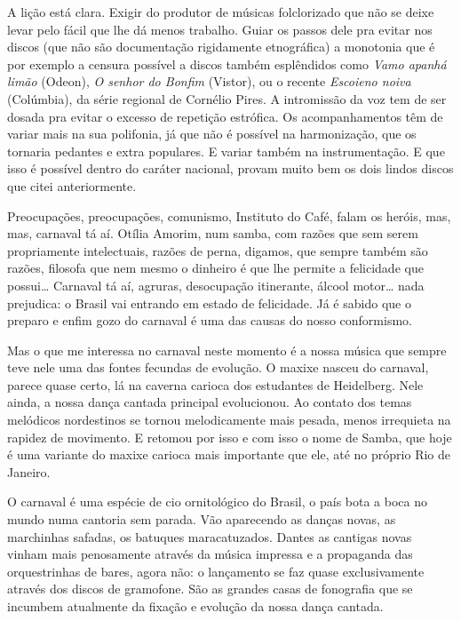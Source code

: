 A lição está clara. Exigir do produtor de músicas folclorizado que não
se deixe levar pelo fácil que lhe dá menos trabalho. Guiar os passos
dele pra evitar nos discos (que não são documentação rigidamente
etnográfica) a monotonia que é por exemplo a censura possível a discos
também esplêndidos como \emph{Vamo apanhá limão} (Odeon), \emph{O senhor
do Bonfim} (Vistor), ou o recente \emph{Escoieno noiva} (Colúmbia), da
série regional de Cornélio Pires. A intromissão da voz tem de ser dosada
pra evitar o excesso de repetição estrófica. Os acompanhamentos têm de
variar mais na sua polifonia, já que não é possível na harmonização, que
os tornaria pedantes e extra populares. E variar também na
instrumentação. E que isso é possível dentro do caráter nacional, provam
muito bem os dois lindos discos que citei anteriormente.



Preocupações, preocupações, comunismo, Instituto do Café, falam os
heróis, mas, mas, carnaval tá aí. Otília Amorim, num samba, com razões
que sem serem propriamente intelectuais, razões de perna, digamos, que
sempre também são razões, filosofa que nem mesmo o dinheiro é que lhe
permite a felicidade que possui\ldots{} Carnaval tá aí, agruras, desocupação
itinerante, álcool motor\ldots{} nada prejudica: o Brasil vai entrando em
estado de felicidade. Já é sabido que o preparo e enfim gozo do carnaval
é uma das causas do nosso conformismo.

Mas o que me interessa no carnaval neste momento é a nossa música que
sempre teve nele uma das fontes fecundas de evolução. O maxixe nasceu do
carnaval, parece quase certo, lá na caverna carioca dos estudantes de
Heidelberg. Nele ainda, a nossa dança cantada principal evolucionou. Ao
contato dos temas melódicos nordestinos se tornou melodicamente mais
pesada, menos irrequieta na rapidez de movimento. E retomou por isso e
com isso o nome de Samba, que hoje é uma variante do maxixe carioca mais
importante que ele, até no próprio Rio de Janeiro.

O carnaval é uma espécie de cio ornitológico do Brasil, o país bota a
boca no mundo numa cantoria sem parada. Vão aparecendo as danças novas,
as marchinhas safadas, os batuques maracatuzados. Dantes as cantigas
novas vinham mais penosamente através da música impressa e a propaganda
das orquestrinhas de bares, agora não: o lançamento se faz quase
exclusivamente através dos discos de gramofone. São as grandes casas de
fonografia que se incumbem atualmente da fixação e evolução da nossa
dança cantada.

